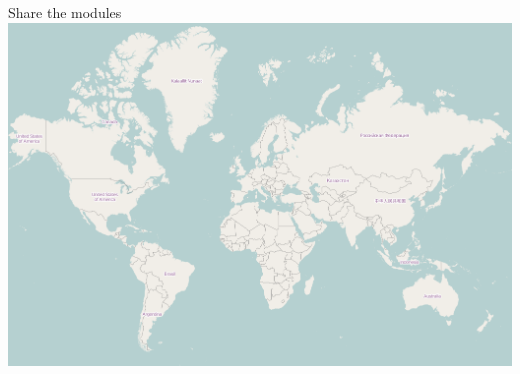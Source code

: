 \documentclass{beamer}
\begin{document}
\begin{frame}{Share the modules}
	\includegraphics[width=\textwidth]{images/worldMap}


\end{frame}
\end{document}
